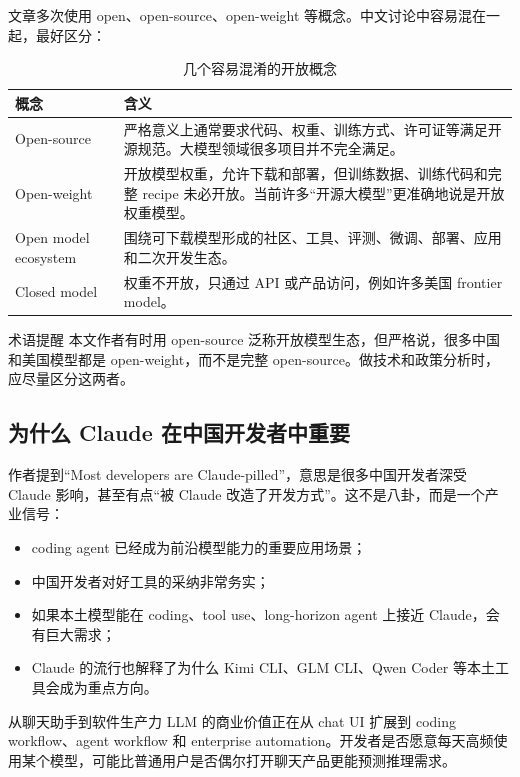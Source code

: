 \documentclass[a4paper]{article}
\begin{document}
文章多次使用 open、open-source、open-weight 等概念。中文讨论中容易混在一起，最好区分：

\begin{table}[H]
\centering
\caption{几个容易混淆的开放概念}
\begin{tabular}{@{}p{3.2cm}p{10cm}@{}}
\toprule
\textbf{概念} & \textbf{含义} \\
\midrule
Open-source & 严格意义上通常要求代码、权重、训练方式、许可证等满足开源规范。大模型领域很多项目并不完全满足。 \\
Open-weight & 开放模型权重，允许下载和部署，但训练数据、训练代码和完整 recipe 未必开放。当前许多``开源大模型''更准确地说是开放权重模型。 \\
Open model ecosystem & 围绕可下载模型形成的社区、工具、评测、微调、部署、应用和二次开发生态。 \\
Closed model & 权重不开放，只通过 API 或产品访问，例如许多美国 frontier model。 \\
\bottomrule
\end{tabular}
\end{table}

\begin{warningbox}{术语提醒}
本文作者有时用 open-source 泛称开放模型生态，但严格说，很多中国和美国模型都是 open-weight，而不是完整 open-source。做技术和政策分析时，应尽量区分这两者。
\end{warningbox}

\subsection{为什么 Claude 在中国开发者中重要}

作者提到``Most developers are Claude-pilled''，意思是很多中国开发者深受 Claude 影响，甚至有点``被 Claude 改造了开发方式''。这不是八卦，而是一个产业信号：

\begin{itemize}[leftmargin=1.5em]
    \item coding agent 已经成为前沿模型能力的重要应用场景；
    \item 中国开发者对好工具的采纳非常务实；
    \item 如果本土模型能在 coding、tool use、long-horizon agent 上接近 Claude，会有巨大需求；
    \item Claude 的流行也解释了为什么 Kimi CLI、GLM CLI、Qwen Coder 等本土工具会成为重点方向。
\end{itemize}

\begin{importantbox}{从聊天助手到软件生产力}
LLM 的商业价值正在从 chat UI 扩展到 coding workflow、agent workflow 和 enterprise automation。开发者是否愿意每天高频使用某个模型，可能比普通用户是否偶尔打开聊天产品更能预测推理需求。
\end{importantbox}
\end{document}
